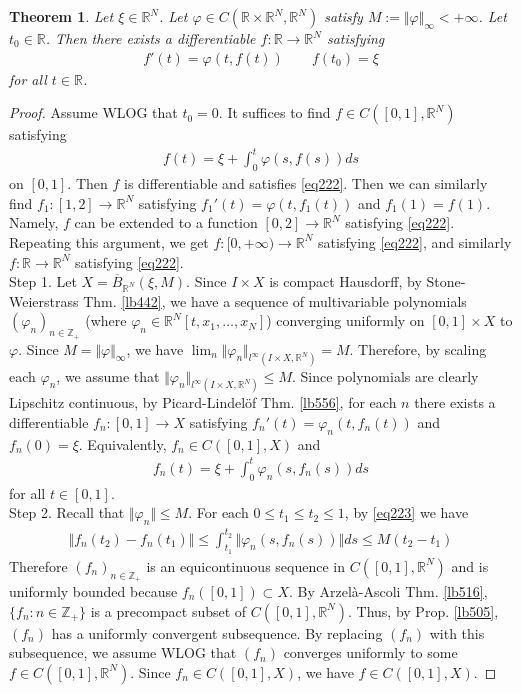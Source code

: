 \documentclass[12pt,b5paper,notitlepage]{article}
\theoremstyle{definition}
\theoremstyle{plain}
\newtheorem{thm}[df]{Theorem}
\newcommand{\ovl}{\overline}
\newcommand{\Zbb}{\mathbb Z}
\newcommand{\Rbb}{\mathbb R}
\numberwithin{equation}{section}
\begin{document}
\begin{thm}\label{lb557}
Let $\xi\in\Rbb^N$. Let $\varphi\in C(\Rbb\times\Rbb^N,\Rbb^N)$ satisfy $M:=\Vert\varphi\Vert_\infty<+\infty$. Let $t_0\in\Rbb$. Then there exists a differentiable $f:\Rbb\rightarrow\Rbb^N$ satisfying
\begin{align}
f'(t)=\varphi(t,f(t))\qquad f(t_0)=\xi \label{eq222}
\end{align}
for all $t\in\Rbb$.
\end{thm}


\begin{proof}
Assume WLOG that $t_0=0$. It suffices to find $f\in C([0,1],\Rbb^N)$ satisfying
\begin{align}
f(t)=\xi+\int_0^t\varphi(s,f(s))ds \label{eq224}
\end{align}
on $[0,1]$. Then $f$ is differentiable and satisfies \eqref{eq222}. Then we can similarly find $f_1:[1,2]\rightarrow\Rbb^N$ satisfying $f_1'(t)=\varphi(t,f_1(t))$ and $f_1(1)=f(1)$. Namely, $f$ can be extended to a function $[0,2]\rightarrow\Rbb^N$ satisfying \eqref{eq222}. Repeating this argument, we get $f:[0,+\infty)\rightarrow\Rbb^N$ satisfying \eqref{eq222}, and similarly $f:\Rbb\rightarrow\Rbb^N$ satisfying \eqref{eq222}.\\[-1ex]

Step 1. Let $X=\ovl B_{\Rbb^N}(\xi,M)$. Since $I\times X$ is compact Hausdorff, by Stone-Weierstrass Thm. \ref{lb442}, we have a sequence of multivariable polynomials $(\varphi_n)_{n\in\Zbb_+}$ (where $\varphi_n\in\Rbb^N[t,x_1,\dots,x_N]$) converging uniformly on $[0,1]\times X$ to $\varphi$. Since $M=\Vert\varphi\Vert_\infty$, we have $\lim_n\Vert\varphi_n\Vert_{l^\infty(I\times X,\Rbb^N)}=M$. Therefore, by scaling each $\varphi_n$, we assume that $\Vert\varphi_n\Vert_{l^\infty(I\times X,\Rbb^N)}\leq M$. Since polynomials are clearly Lipschitz continuous, by Picard-Lindel\"of Thm. \ref{lb556}, for each $n$ there exists a differentiable $f_n:[0,1]\rightarrow X$ satisfying $f_n'(t)=\varphi_n(t,f_n(t))$ and $f_n(0)=\xi$. Equivalently, $f_n\in C([0,1],X)$ and
\begin{align}
f_n(t)=\xi+\int_0^t\varphi_n(s,f_n(s))ds \label{eq223}
\end{align}
for all $t\in[0,1]$.\\[-1ex]

Step 2. Recall that $\Vert\varphi_n\Vert\leq M$. For each $0\leq t_1\leq t_2\leq 1$, by \eqref{eq223} we have
\begin{align*}
\Vert f_n(t_2)-f_n(t_1)\Vert\leq\int_{t_1}^{t_2}\Vert\varphi_n(s,f_n(s))\Vert ds\leq M(t_2-t_1)
\end{align*}
Therefore $(f_n)_{n\in\Zbb_+}$ is an equicontinuous sequence in $C([0,1],\Rbb^N)$ and is uniformly bounded because $f_n([0,1])\subset X$. By Arzel\`a-Ascoli Thm. \ref{lb516}, $\{f_n:n\in\Zbb_+\}$ is a precompact subset of $C([0,1],\Rbb^N)$. Thus, by Prop. \ref{lb505}, $(f_n)$ has a uniformly convergent subsequence. By replacing $(f_n)$ with this subsequence, we assume WLOG that $(f_n)$ converges uniformly to some $f\in C([0,1],\Rbb^N)$. Since $f_n\in C([0,1],X)$, we have $f\in C([0,1],X)$.


\end{proof}
\end{document}
